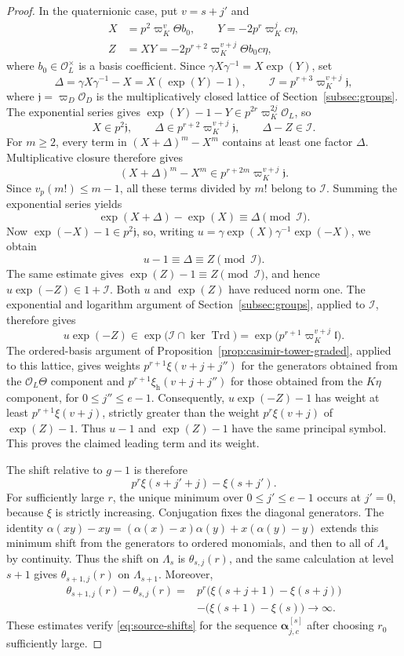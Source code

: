 \documentclass[11pt]{article}
\numberwithin{equation}{section}
\theoremstyle{definition}
\theoremstyle{remark}
\newcommand{\cO}{\mathcal O}
\DeclareMathOperator{\Trd}{Trd}
\begin{document}
\begin{proof}
In the quaternionic case, put $v=s+j'$ and
\[
 \begin{aligned}
 X&=p^2\varpi_K^v\Theta b_0,\qquad
 Y=-2p^r\varpi_K^jc\eta,\\
 Z&=XY=-2p^{r+2}\varpi_K^{v+j}\Theta b_0c\eta,
 \end{aligned}
\]
where $b_0\in\cO_L^\times$ is a basis coefficient.
Since $\gamma X\gamma^{-1}=X\exp(Y)$, set
\[
 \Delta=\gamma X\gamma^{-1}-X=X(\exp(Y)-1),\qquad
 \mathcal I=p^{r+3}\varpi_K^{v+j}\mathfrak j,
\]
where $\mathfrak j=\varpi_D\cO_D$ is the multiplicatively closed
lattice of Section~\ref{subsec:groups}. The exponential series gives
$\exp(Y)-1-Y\in p^{2r}\varpi_K^{2j}\cO_L$, so
\[
 X\in p^2\mathfrak j,\qquad
 \Delta\in p^{r+2}\varpi_K^{v+j}\mathfrak j,\qquad
 \Delta-Z\in\mathcal I.
\]
For $m\geq2$, every term in $(X+\Delta)^m-X^m$ contains at
least one factor $\Delta$. Multiplicative closure therefore gives
\[
 (X+\Delta)^m-X^m
   \in p^{r+2m}\varpi_K^{v+j}\mathfrak j.
\]
Since $v_p(m!)\leq m-1$, all these terms divided by $m!$ belong
to $\mathcal I$. Summing the exponential series yields
\[
 \exp(X+\Delta)-\exp(X)\equiv\Delta\pmod{\mathcal I}.
\]
Now $\exp(-X)-1\in p^2\mathfrak j$, so, writing
$u=\gamma\exp(X)\gamma^{-1}\exp(-X)$, we obtain
\[
 u-1\equiv\Delta\equiv Z\pmod{\mathcal I}.
\]
The same estimate gives $\exp(Z)-1\equiv Z\pmod{\mathcal I}$,
and hence $u\exp(-Z)\in1+\mathcal I$.
Both $u$ and $\exp(Z)$ have reduced norm one. The exponential
and logarithm argument of Section~\ref{subsec:groups}, applied to
$\mathcal I$, therefore gives
\[
 u\exp(-Z)\in
 \exp\bigl(\mathcal I\cap\ker\Trd\bigr)
 =\exp\bigl(p^{r+1}\varpi_K^{v+j}\mathfrak l\bigr).
\]
The ordered-basis argument of
Proposition~\ref{prop:casimir-tower-graded}, applied to this lattice,
gives weights $p^{r+1}\xi(v+j+j'')$ for the generators obtained
from the $\cO_L\Theta$ component and
$p^{r+1}\xi_{\mathrm h}(v+j+j'')$ for those obtained from the
$K\eta$ component, for $0\leq j''\leq e-1$.
Consequently, $u\exp(-Z)-1$ has weight at least
$p^{r+1}\xi(v+j)$, strictly greater than the weight
$p^r\xi(v+j)$ of $\exp(Z)-1$.
Thus $u-1$ and $\exp(Z)-1$ have the same principal symbol.
This proves the claimed leading term and its weight.

The shift relative to $g-1$ is therefore
\[
 p^r\xi(s+j'+j)-\xi(s+j').
\]
For sufficiently large $r$, the unique minimum over $0\leq j'\leq e-1$
occurs at $j'=0$, because $\xi$ is strictly increasing.
Conjugation fixes the diagonal generators. The identity
$\alpha(xy)-xy=(\alpha(x)-x)\alpha(y)+x(\alpha(y)-y)$
extends this minimum shift from the generators to ordered monomials,
and then to all of $\Lambda_s$ by continuity.
Thus the shift on $\Lambda_s$ is $\theta_{s,j}(r)$, and the same
calculation at level $s+1$ gives $\theta_{s+1,j}(r)$ on
$\Lambda_{s+1}$. Moreover,
\[
 \begin{split}
 \theta_{s+1,j}(r)-\theta_{s,j}(r)
 ={}&p^r\bigl(\xi(s+j+1)-\xi(s+j)\bigr)\\
    &-\bigl(\xi(s+1)-\xi(s)\bigr)\longrightarrow\infty.
 \end{split}
\]
These estimates verify \eqref{eq:source-shifts} for the sequence
$\boldsymbol\alpha^{[s]}_{j,c}$ after choosing $r_0$ sufficiently large.
\end{proof}
\end{document}
